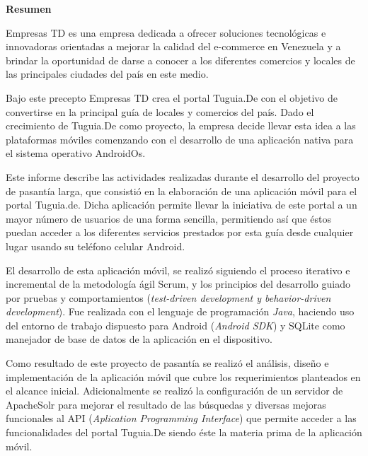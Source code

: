 \setcounter{page}{4}
\begin{center}
	{\bf Resumen}
\end{center}	

Empresas TD es una empresa dedicada a ofrecer soluciones tecnológicas e innovadoras orientadas a mejorar la calidad del e-commerce en Venezuela y a brindar la oportunidad de darse a conocer a los diferentes comercios y locales de las principales ciudades del país en este medio.

Bajo este precepto Empresas TD crea el portal Tuguia.De con el objetivo de convertirse en la 
principal guía de locales y comercios del país. Dado el crecimiento de Tuguia.De como proyecto, la empresa decide llevar esta idea a las plataformas móviles comenzando con el desarrollo de una aplicación nativa para el sistema operativo AndroidOs. 

Este informe describe las actividades realizadas durante el desarrollo del proyecto de pasantía larga, que consistió en la elaboración de una aplicación móvil para el portal Tuguia.de. Dicha aplicación permite llevar la iniciativa de este portal a un mayor número de usuarios de una forma sencilla, permitiendo así que éstos puedan acceder a los diferentes servicios prestados por esta guía desde cualquier lugar usando su teléfono celular Android.

El desarrollo de esta aplicación móvil, se realizó siguiendo el proceso iterativo e incremental de la metodología ágil Scrum, y los principios del desarrollo guiado por 
pruebas y comportamientos (\textit{test-driven development y behavior-driven development}). 
Fue realizada con el lenguaje de programación \textit{Java}, haciendo uso del entorno de trabajo dispuesto para Android (\textit{Android SDK}) y SQLite como manejador de base de datos de la aplicación en el dispositivo.

Como resultado de este proyecto de pasantía se realizó el análisis, diseño e implementación de la aplicación móvil que cubre los requerimientos planteados en el alcance inicial. Adicionalmente se realizó la configuración de un servidor de ApacheSolr para mejorar
el resultado de las búsquedas y diversas mejoras funcionales al API (\textit{Aplication Programming Interface}) que permite acceder a las funcionalidades del portal Tuguia.De siendo 
éste la materia prima de la aplicación móvil.

